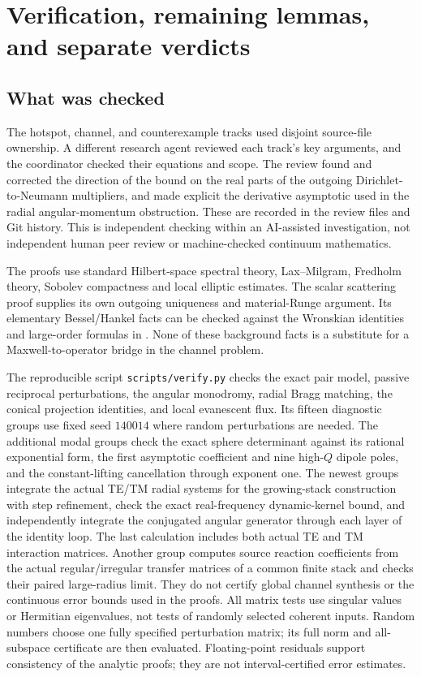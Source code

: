 \section{Verification, remaining lemmas, and separate verdicts}
\label{ver:section}

\subsection{What was checked}
The hotspot, channel, and counterexample tracks used disjoint source-file
ownership. A different research agent reviewed each track's key arguments,
and the coordinator checked their equations and scope. The review found and
corrected the direction of the bound on the real parts of the outgoing
Dirichlet-to-Neumann multipliers, and made explicit the derivative
asymptotic used in the radial angular-momentum obstruction. These are
recorded in the review files and Git history. This is independent checking
within an AI-assisted investigation, not independent human peer review or
machine-checked continuum mathematics.

The proofs use standard Hilbert-space spectral theory, Lax--Milgram,
Fredholm theory, Sobolev compactness and local elliptic estimates. The
scalar scattering proof supplies its own outgoing uniqueness and
material-Runge argument. Its elementary Bessel/Hankel facts can be checked
against the Wronskian identities and large-order formulas in
\cite{dlmf}. None of these background facts is a substitute for a
Maxwell-to-operator bridge in the channel problem.

The reproducible script \texttt{scripts/verify.py} checks the exact pair
model, passive reciprocal perturbations, the angular monodromy, radial
Bragg matching, the conical projection identities, and local evanescent
flux. Its fifteen diagnostic groups use fixed seed $140014$ where
random perturbations are needed.  The additional modal groups check
the exact sphere determinant against its rational exponential form,
the first asymptotic coefficient and nine high-$Q$ dipole poles,
and the constant-lifting cancellation through exponent one.
The newest groups integrate the actual TE/TM radial systems for the
growing-stack construction with step refinement, check the exact
real-frequency dynamic-kernel bound, and independently integrate the
conjugated angular generator through each layer of the identity loop.
The last calculation includes both actual TE and TM interaction matrices.
Another group computes source reaction coefficients from the actual
regular/irregular transfer matrices of a common finite stack and checks
their paired large-radius limit.
They do not certify global channel
synthesis or the continuous error bounds used in the proofs.
All matrix tests use singular values or Hermitian eigenvalues, not tests
of randomly selected coherent inputs. Random numbers choose one fully
specified perturbation matrix; its full norm and all-subspace certificate
are then evaluated. Floating-point residuals support consistency of the
analytic proofs; they are not interval-certified error estimates.

